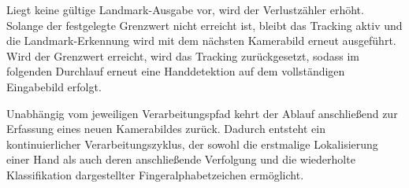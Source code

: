 Liegt keine gültige Landmark-Ausgabe vor, wird der Verlustzähler erhöht. Solange der festgelegte Grenzwert nicht erreicht ist, bleibt das Tracking aktiv und die Landmark-Erkennung wird mit dem nächsten Kamerabild erneut ausgeführt. Wird der Grenzwert erreicht, wird das Tracking zurückgesetzt, sodass im folgenden Durchlauf erneut eine Handdetektion auf dem vollständigen Eingabebild erfolgt.

Unabhängig vom jeweiligen Verarbeitungspfad kehrt der Ablauf anschließend zur Erfassung eines neuen Kamerabildes zurück. Dadurch entsteht ein kontinuierlicher Verarbeitungszyklus, der sowohl die erstmalige Lokalisierung einer Hand als auch deren anschließende Verfolgung und die wiederholte Klassifikation dargestellter Fingeralphabetzeichen ermöglicht.
